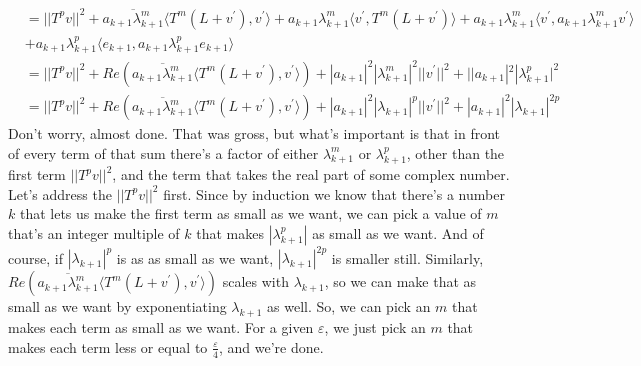 \documentclass{article}
\begin{document}
\begin{align*}
&=||T^{p}v||^{2} + \overline{a_{k+1}\lambda^{m}_{k+1}}\langle T^{m}(L+v^{\prime}),v^{\prime} \rangle +a_{k+1}\lambda^{m}_{k+1} \langle v^{\prime}, T^{m}(L+v^{\prime})\rangle +a_{k+1}\lambda^{m}_{k+1} \langle v^{\prime},  a_{k+1}\lambda^{m}_{k+1}v^{\prime} \rangle\\
&+a_{k+1}\lambda^{p}_{k+1} \langle e_{k+1}, a_{k+1}\lambda^{p}_{k+1}e_{k+1} \rangle\\
&=||T^{p}v||^{2} + Re(\overline{a_{k+1}\lambda^{m}_{k+1}}\langle T^{m}(L+v^{\prime}),v^{\prime} \rangle) + |a_{k+1}|^{2}|\lambda^{m}_{k+1}|^{2}||v^{\prime}||^{2} + ||a_{k+1}|^{2}|\lambda^{p}_{k+1}|^{2}\\
&=||T^{p}v||^{2} + Re(\overline{a_{k+1}\lambda^{m}_{k+1}}\langle T^{m}(L+v^{\prime}),v^{\prime} \rangle) + |a_{k+1}|^{2}|\lambda_{k+1}|^{p}||v^{\prime}||^{2} + |a_{k+1}|^{2}|\lambda_{k+1}|^{2p}
\end{align*}
Don't worry, almost done. That was gross, but what's important is that in front of every term of that sum there's a factor of either $\lambda^{m}_{k+1}$ or $\lambda^{p}_{k+1}$, other than the first term $||T^{p}v||^{2}$, and the term that takes the real part of some complex number. Let's address the $||T^{p}v||^{2}$ first. Since by induction we know that there's a number $k$ that lets us make the first term as small as we want, we can pick a value of $m$ that's an integer multiple of $k$ that makes $|\lambda_{k+1}^{p}|$ as small as we want. And of course, if $|\lambda_{k+1}|^{p}$ is as as small as we want, $|\lambda_{k+1}|^{2p}$ is smaller still. Similarly, $Re(\overline{a_{k+1}\lambda^{m}_{k+1}}\langle T^{m}(L+v^{\prime}),v^{\prime} \rangle)$ scales with $\lambda_{k+1}$, so we can make that as small as we want by exponentiating $\lambda_{k+1}$ as well. So, we can pick an $m$ that makes each term as small as we want. For a given $\varepsilon$, we just pick an $m$ that makes each term less or equal to $\frac{\varepsilon}{4}$, and we're done. 
\end{document}
